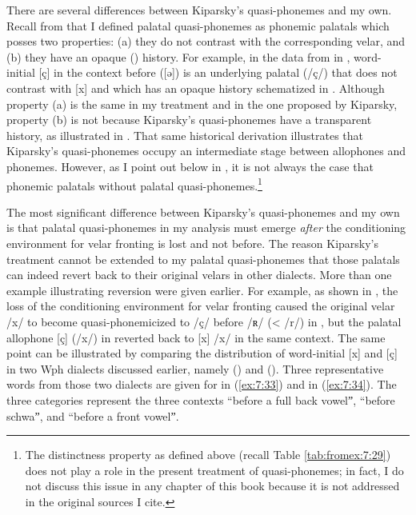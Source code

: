 There are several differences between Kiparsky’s quasi-phonemes and my own. Recall from  that I defined palatal quasi-phonemes as phonemic palatals which posses two properties: (a) they do not contrast with the corresponding velar, and (b) they have an opaque () history. For example, in the data from  in , word-initial [ç] in the context before  ([ə]) is an underlying palatal (/ç/) that does not contrast with [x] and which has an opaque history schematized in . Although property (a) is the same in my treatment and in the one proposed by Kiparsky, property (b) is not because Kiparsky’s quasi-phonemes have a transparent history, as illustrated in . That same historical derivation illustrates that Kiparsky’s quasi-phonemes occupy an intermediate stage between allophones and phonemes. However, as I point out below in , it is not always the case that phonemic palatals without palatal quasi-phonemes.\footnote{{The distinctness property as defined above (recall Table \ref{tab:fromex:7:29}) does not play a role in the present treatment of quasi-phonemes; in fact, I do not discuss this issue in any chapter of this book because it is not addressed in the original sources I cite.} }

The most significant difference between Kiparsky’s quasi-phonemes and my own is that palatal quasi-phonemes in my analysis must emerge \textit{after} the conditioning environment for velar fronting is lost and not before. The reason Kiparsky's treatment cannot be extended to my palatal quasi-phonemes that those palatals can indeed revert back to their original velars in other dialects. More than one example illustrating reversion were given earlier. For example, as shown in , the loss of the conditioning environment for velar fronting caused the original velar /x/ to become quasi-phonemicized to /ç/ before /ʀ/ (< /r/) in , but the palatal allophone [ç] (/x/) in  reverted back to [x] /x/ in the same context. The same point can be illustrated by comparing the distribution of word-initial [x] and [ç] in two Wph dialects discussed earlier, namely  () and  (). Three representative words from those two dialects are given for  in (\ref{ex:7:33}) and  in (\ref{ex:7:34}). The three categories represent the three contexts “before a full back vowelˮ, “before schwaˮ, and “before a front vowelˮ.



